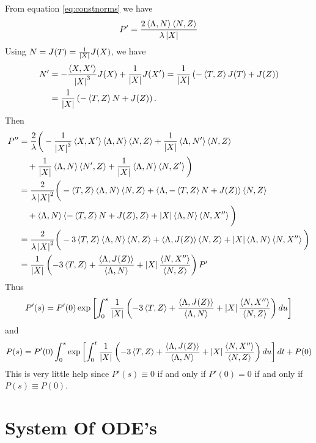 \documentclass[12pt]{article}
\begin{document}
From equation \eqref{eq:constnorms} we have
\[
P' = \frac{2\inpr{\Lambda}{N}\inpr{N}{Z}}{\lambda\abs{X}}
\]
Using \(N = J(T) = \frac{1}{\abs{X}} J(X)\), we have
\[
\begin{split}
N' &= -\frac{\inpr{X}{X'}}{\abs{X}^3} J(X) + \frac{1}{\abs{X}}J(X') = \frac{1}{\abs{X}}\left(-\inpr{T}{Z} J(T) + J(Z)\right) \\
&= \frac{1}{\abs{X}}\left(-\inpr{T}{Z} N + J(Z)\right).
\end{split}
\]
Then
\[
\begin{split}
P'' &= \frac{2}{\lambda}\bigg(-\frac{1}{\abs{X}^3} \inpr{X}{X'} \inpr{\Lambda}{N}\inpr{N}{Z} + \frac{1}{\abs{X}} \inpr{\Lambda}{N'}\inpr{N}{Z} \\
&\quad + \frac{1}{\abs{X}} \inpr{\Lambda}{N}\inpr{N'}{Z} + \frac{1}{\abs{X}} \inpr{\Lambda}{N}\inpr{N}{Z'}\bigg) \\
&= \frac{2}{\lambda\abs{X}^2}\bigg(-\inpr{T}{Z} \inpr{\Lambda}{N}\inpr{N}{Z} + \inpr{\Lambda}{-\inpr{T}{Z} N + J(Z)}\inpr{N}{Z} \\
&\quad + \inpr{\Lambda}{N}\inpr{-\inpr{T}{Z} N + J(Z)}{Z} + \abs{X} \inpr{\Lambda}{N}\inpr{N}{X''}\bigg) \\
&= \frac{2}{\lambda\abs{X}^2}\bigg(-3\inpr{T}{Z} \inpr{\Lambda}{N}\inpr{N}{Z} + \inpr{\Lambda}{J(Z)}\inpr{N}{Z} + \abs{X} \inpr{\Lambda}{N}\inpr{N}{X''}\bigg) \\
&= \frac{1}{\abs{X}} \left(-3\inpr{T}{Z} + \frac{\inpr{\Lambda}{J(Z)}}{\inpr{\Lambda}{N}} + \abs{X} \frac{\inpr{N}{X''}}{\inpr{N}{Z}} \right) P'
\end{split}
\]
Thus
\[
P'(s) = P'(0) \exp\left[\int_0^s \frac{1}{\abs{X}} \left(-3\inpr{T}{Z} + \frac{\inpr{\Lambda}{J(Z)}}{\inpr{\Lambda}{N}} + \abs{X} \frac{\inpr{N}{X''}}{\inpr{N}{Z}} \right)du \right]
\]
and
\[
P(s) = P'(0) \int_0^s \exp\left[\int_0^t \frac{1}{\abs{X}} \left(-3\inpr{T}{Z} + \frac{\inpr{\Lambda}{J(Z)}}{\inpr{\Lambda}{N}} + \abs{X} \frac{\inpr{N}{X''}}{\inpr{N}{Z}} \right)du\right] dt + P(0)
\]
{\color{red}This is very little help since \(P'(s) \equiv 0\) if and only if \(P'(0) = 0\) if and only if \(P(s) \equiv P(0)\).}
\section{System Of ODE's}
\label{sec:ode_sys}
\end{document}
